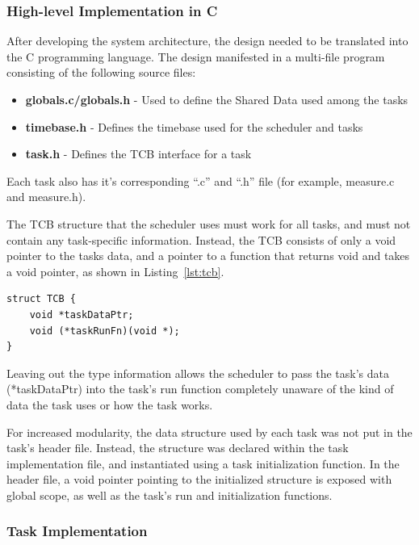 \documentclass[12pt]{article} %
\begin{document}
    \subsubsection{High-level Implementation in C}
    After developing the system architecture, the design needed to be translated into the C programming language. The design manifested in a multi-file program consisting of the following source files:
    \begin{itemize}
      \item \textbf{globals.c/globals.h} - Used to define the Shared Data used among the tasks
      \item \textbf{timebase.h} - Defines the timebase used for the scheduler and tasks
      \item \textbf{task.h} - Defines the TCB interface for a task
    \end{itemize}
    Each task also has it's corresponding ``.c'' and ``.h'' file (for example, measure.c and measure.h).

    The TCB structure that the scheduler uses must work for all tasks, and must
    not contain any task-specific information. Instead, the TCB consists of
    only a void pointer to the tasks data, and a pointer to a function that
    returns void and takes a void pointer, as shown in Listing~\ref{lst:tcb}.

\begin{lstlisting}[caption=TCB Construct, captionpos=b, label=lst:tcb]
struct TCB {
    void *taskDataPtr;
    void (*taskRunFn)(void *);
}
\end{lstlisting}
    Leaving out the type information allows the scheduler to pass the task's data
    (*taskDataPtr) into the task's run function completely unaware of the kind of
    data the task uses or how the task works.

    For increased modularity, the data structure used by each task was not put in
    the task's header file. Instead, the structure was declared within the task
    implementation file, and instantiated using a task initialization function. In
    the header file, a void pointer pointing to the initialized structure is
    exposed with global scope, as well as the task's run and initialization functions.

    \subsubsection{Task Implementation}

\end{document}
